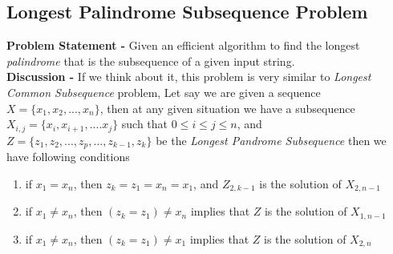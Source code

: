 \documentclass[10pt,a4paper,draft]{article}
\begin{document}
\subsection{Longest Palindrome Subsequence Problem}
\textbf{Problem Statement -} Given an efficient algorithm to find the longest \emph{palindrome} that is the subsequence of a given input string.
\\[12pt]
\textbf{Discussion -} If we think about it, this problem is very similar to \emph{Longest Common Subsequence} problem, Let say we are given a sequence $X = \{x_1,x_2,...,x_n\}$, then at any given situation we have a subsequence $X_{i,j} = \{x_i,x_{i+1},....x_j\}$ such that $0 \leq i \leq j \leq n$, and $Z = \{z_1,z_2,...,z_p,...,z_{k-1},z_k\}$ be the \emph{Longest Pandrome Subsequence} then we have following conditions
\begin{enumerate}
\item if $x_1=x_n$, then $z_k=z_1=x_n=x_1$, and $Z_{2,k-1}$ is the solution of $X_{2,n-1}$ 
\item if $x_1 \neq x_n$, then $(z_k = z_1) \neq x_n$ implies that $Z$ is the solution of $X_{1,n-1}$ 
\item if $x_1 \neq x_n$, then $(z_k = z_1) \neq x_1$ implies that $Z$ is the solution of $X_{2,n}$ 
\end{enumerate}
\end{document}
